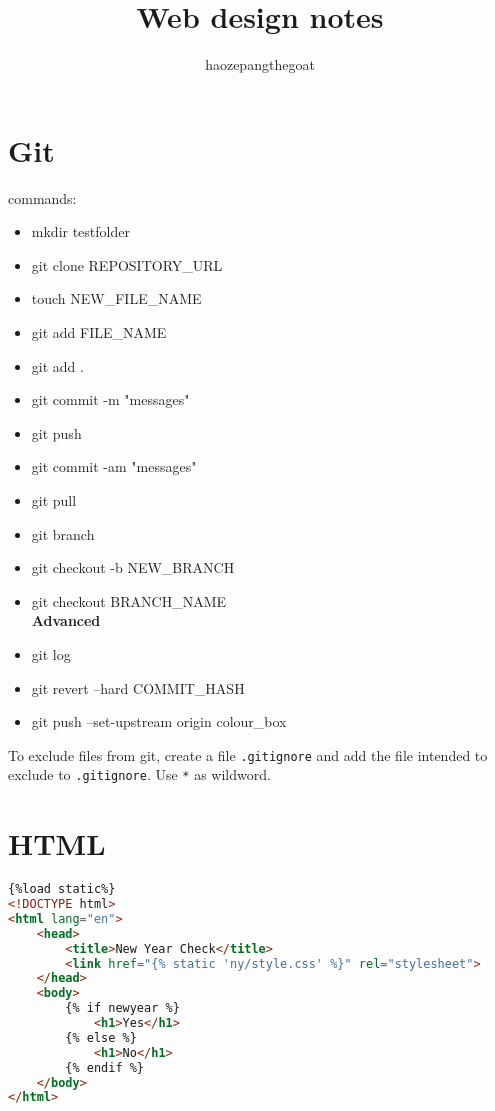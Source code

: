 \documentclass[12,a4paper]{article}
\title{Web design notes}
\author{haozepangthegoat}
\begin{document}
\maketitle
\section{Git}
\ttfamily
commands:
\begin{itemize}
		\item mkdir testfolder
		\item git clone REPOSITORY\_URL
		\item touch NEW\_FILE\_NAME
		\item git add FILE\_NAME
		\item git add . 
		\item git commit -m "messages"
		\item git push
		\item git commit -am "messages"
		\item git pull
		\item git branch
		\item git checkout -b NEW\_BRANCH
		\item git checkout BRANCH\_NAME\\
	
		\color{blue}
		\textbf{Advanced}
		\item git log
		\item git revert --hard COMMIT\_HASH
		\item git push --set-upstream origin colour\_box
\end{itemize}
\normalfont
To exclude files from git, create a file \texttt{.gitignore} and add the file intended to exclude to \texttt{.gitignore}. Use \texttt{*} as wildword. 

\section{HTML}
\begin{tcolorbox}[title= \centering Example code, colback= VSblack, width =150mm]
\centering
	\begin{lstlisting}[language = HTML]
{%load static%}
<!DOCTYPE html>
<html lang="en">
    <head>
        <title>New Year Check</title>
        <link href="{% static 'ny/style.css' %}" rel="stylesheet">
    </head>
    <body>
        {% if newyear %}
            <h1>Yes</h1>
        {% else %}
            <h1>No</h1>
        {% endif %}
    </body>
</html>	\end{lstlisting}
\end{tcolorbox}
%
\end{document}

